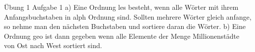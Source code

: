Übung 1 
Aufgabe 1
a) Eine Ordnung les besteht, wenn alle Wörter  mit ihrem Anfangsbuchstaben in alph Ordnung sind.
   Sollten mehrere Wörter gleich anfange, so nehme man den nächsten Buchstaben und sortiere daran 
   die Wörter.
b) Eine Ordnung geo ist dann gegeben wenn alle Elemente der Menge Millionenstädte von Ost nach 
   West sortiert sind.
   
